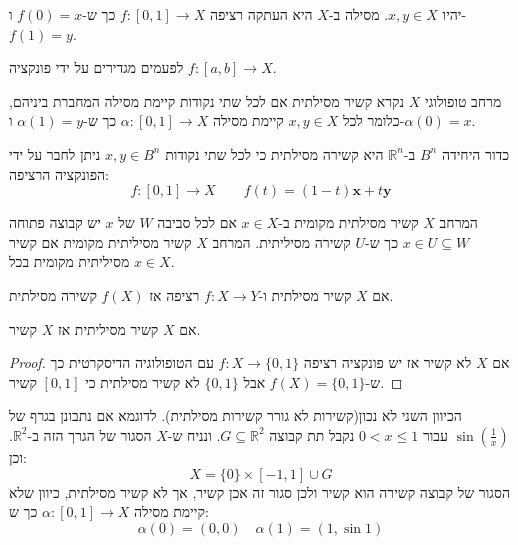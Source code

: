 \documentclass{tstextbook}
\begin{document}
\begin{definition}[מסילה]
יהיו \(x,y\in X\). מסילה ב-\(X\) היא העתקה רציפה \(f:[0,1]\to X\) כך ש-\(f(0)=x\) ו-\(f(1)=y\).

\end{definition}
\begin{remark}
לפעמים מגדירים על ידי פונקציה \(f:[a,b]\to X\).

\end{remark}
\begin{definition}
מרחב טופולוגי \(X\) נקרא קשיר מסילתית אם לכל שתי נקודות קיימת מסילה המחברת ביניהם, כלומר לכל \(x,y \in X\) קיימת מסילה \(\alpha:[0,1]\to X\) כך ש-\(\alpha(1)=y\) ו-\(\alpha(0)=x\).

\end{definition}
\begin{example}
כדור היחידה \(B^{n}\) ב-\(\mathbb{R}^{n}\) היא קשירה מסילתית כי לכל שתי נקודות \(x,y \in B^{n}\) ניתן לחבר על ידי הפונקציה הרציפה:
$$f:[0,1]\to X\qquad f(t)=(1-t)\mathbf{x}+t\mathbf{y}$$

\end{example}
\begin{definition}
המרחב \(X\) קשיר מסילתית מקומית ב-\(x \in X\) אם לכל סביבה \(W\) של \(x\) יש קבוצה פתוחה \(x \in U\subseteq W\) כך ש-\(U\) קשירה מסיליתית. המרחב \(X\) קשיר מסיליתית מקומית אם קשיר מסיליתית מקומית בכל \(x \in X\).

\end{definition}
\begin{proposition}
אם \(X\) קשיר מסילתית ו-\(f:X\to Y\) רציפה אז \(f(X)\) קשירה מסילתית.

\end{proposition}
\begin{proposition}
אם \(X\) קשיר מסיליתית אז \(X\) קשיר.

\end{proposition}
\begin{proof}
אם \(X\) לא קשיר אז יש פונקציה רציפה \(f:X\to \{ 0,1 \}\) עם הטופולוגיה הדיסקרטית כך ש-\(f(X)=\{ 0,1 \}\) אבל \(\{ 0,1 \}\) לא קשיר מסילתית כי \([0,1]\) קשיר.

\end{proof}
\begin{remark}
הכיוון השני לא נכון(קשירות לא גורר קשירות מסילתית). לדוגמא אם נתבונן בגרף של \(\sin\left( \frac{1}{x} \right)\) עבור \(0<x\leq 1\) נקבל תת קבוצה \(G\subseteq \mathbb{R}^{2}\). ונניח ש-\(X\) הסגור של הגרך הזה ב-\(\mathbb{R}^{2}\). וכן:
$$X=\{ 0 \}\times[-1,1]\cup  G$$
הסגור של קבוצה קשירה הוא קשיר ולכן סגור זה אכן קשיר, אך לא קשיר מסילתית, כיוון שלא קיימת מסילה \(\alpha:[0,1]\to X\) כך ש:
$$\alpha(0)=(0,0)\quad \alpha(1)=(1,\sin 1)$$

\end{remark}
\end{document}
